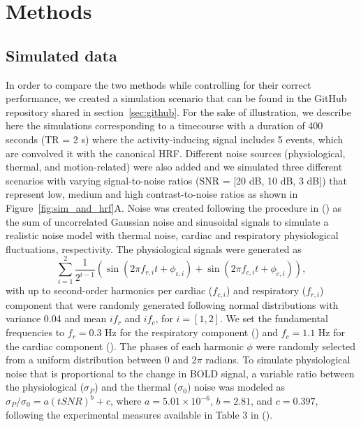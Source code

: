 
\section{Methods}
\label{sec:data}

\subsection{Simulated data}

In order to compare the two methods while controlling for their correct performance, we created a simulation scenario that can be found in the GitHub repository shared in section~\ref{sec:github}. For the sake of illustration, we describe here the simulations corresponding to a timecourse with a duration of 400 seconds (TR = 2 s) where the activity-inducing signal includes 5 events, which are convolved it with the canonical HRF. Different noise sources (physiological, thermal, and motion-related) were also added and we simulated three different scenarios with varying signal-to-noise ratios (SNR = [20 dB, 10 dB, 3 dB]) that represent low, medium and high contrast-to-noise ratios as shown in Figure~\ref{fig:sim_and_hrf}A. Noise was created following the procedure in (\citealt{Gaudes2013Paradigmfreemapping}) as the sum of uncorrelated Gaussian noise and sinusoidal signals to simulate a realistic noise model with thermal noise, cardiac and respiratory physiological fluctuations, respectivity. The physiological signals were generated as
\begin{equation}
    \sum_{i=1}^{2} \frac{1}{2^{i-1}}\left(\sin \left(2 \pi f_{r, i} t+\phi_{\mathrm{r}, i}\right)+\sin \left(2 \pi f_{c, i} t+\phi_{c, i}\right)\right),
\end{equation}
with up to second-order harmonics per cardiac (\(f_{c,i}\)) and respiratory (\(f_{r,i}\)) component that were randomly generated following normal distributions with variance 0.04 and mean \(if_r\) and \(if_c\), for \(i = [1, 2]\). We set the fundamental frequencies to \(f_r = 0.3\) Hz for the respiratory component (\citealt{Birn2006Separatingrespiratoryvariation}) and \(f_c = 1.1\) Hz for the cardiac component (\citealt{Shmueli2007Lowfrequencyfluctuations}). The phases of each harmonic \(\phi\) were randomly selected from a uniform distribution between 0 and 2$\pi$ radians. To simulate physiological noise that is proportional to the change in BOLD signal, a variable ratio between the physiological (\(\sigma_P\)) and the thermal (\(\sigma_0\)) noise was modeled as \(\sigma_P/\sigma_0 = a(tSNR)^b + c\), where \(a = 5.01 \times 10^{-6}\), \(b = 2.81\), and \(c = 0.397\), following the experimental measures available in Table 3 in (\citealt{Triantafyllou2005Comparisonphysiologicalnoise}).

